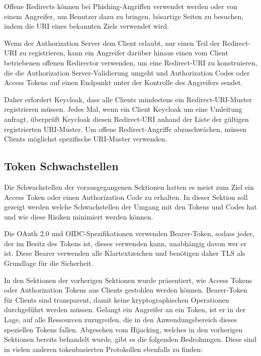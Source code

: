 Offene Redirects können bei Phishing-Angriffen verwendet werden oder von einem Angreifer, um Benutzer dazu zu bringen, bösartige Seiten zu besuchen, indem die URI eines bekannten Ziels verwendet wird. \cite{SSEB_OAuthAuthorizationSecurityConsiderations}

Wenn der Authorization Server dem Client erlaubt, nur einen Teil der Redirect-URI zu registrieren, kann ein Angreifer darüber hinaus einen vom Client betriebenen offenen Redirector verwenden, um eine Redirect-URI zu konstruieren, die die Authorization Server-Validierung umgeht und Authorization Codes oder Access Tokens auf einen Endpunkt unter der Kontrolle des Angreifers sendet. \cite{SSEB_OAuthAuthorizationSecurityConsiderations}

Daher erfordert Keycloak, dass alle Clients mindestens ein Redirect-URI-Muster registrieren müssen. Jedes Mal, wenn ein Client Keycloak um eine Umleitung anfragt, überprüft Keycloak diesen Redirect-URI anhand der Liste der gültigen registrierten URI-Muster. Um offene Redirect-Angriffe abzuschwächen, müssen Clients möglichst spezifische URI-Muster verwenden. \cite[Sec. 19]{SSEB_keycloakDocs}

\subsection{Token Schwachstellen}

Die Schwachstellen der vorausgegangenen Sektionen hatten es meist zum Ziel ein Access Token oder einen Authorization Code zu erhalten. In dieser Sektion soll gezeigt werden welche Schwachstellen der Umgang mit den Tokens und Codes hat und wie diese Risiken minimiert werden können. 


Die OAuth 2.0 und OIDC-Spezifikationen verwenden Bearer-Token, sodass jeder, der im Besitz des Tokens ist, dieses verwenden kann, unabhängig davon wer er ist. Diese Bearer verwenden alle Klartextzeichen und benötigen daher TLS als Grundlage für die Sicherheit. \cite{SSEB_OAuthAuthorizationSecurityConsiderations}

In den Sektionen der vorherigen Sektionen wurde präsentiert, wie Access Tokens oder Authorization Tokens aus Clients gestohlen werden können. Bearer-Token für Clients sind transparent, damit keine kryptographischen Operationen durchgeführt werden müssen. Gelangt ein Angreifer an ein Token, ist er in der Lage, auf alle Ressourcen zuzugreifen, die in den Anwendungsbereich dieses speziellen Tokens fallen. Abgesehen vom Hijacking, welches in den vorherigen Sektionen bereits behandelt wurde, gibt es die folgenden Bedrohungen. Diese sind in vielen anderen tokenbasierten Protokollen ebenfalls zu finden:


